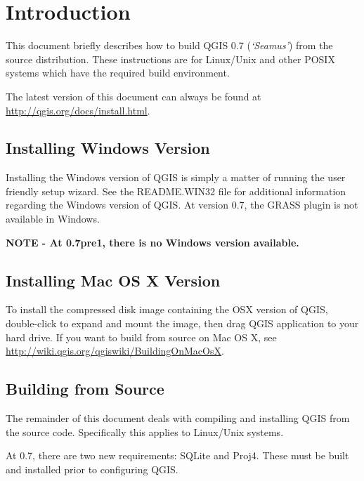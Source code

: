 
\section{Introduction}\label{label_introduction}
This document briefly describes how to build QGIS 0.7 (\textit{`Seamus'}) from the source distribution. These instructions are for Linux/Unix and other POSIX systems which have the required build environment.

The latest version of this document can always be found at \url{http://qgis.org/docs/install.html}.
\subsection{Installing Windows Version}
Installing the Windows version of QGIS is simply a matter of running the user friendly setup wizard. See the README.WIN32 file for additional information regarding the Windows version of QGIS. At version 0.7, the GRASS plugin is not available in Windows.

\textbf{NOTE - At 0.7pre1, there is no Windows version available.}

\subsection{Installing Mac OS X Version}
To install the compressed disk image containing the OSX version of QGIS,
double-click to expand and mount the image, then drag QGIS application to your
hard drive. If you want to build from source on Mac OS X, see \url{http://wiki.qgis.org/qgiswiki/BuildingOnMacOsX}.


\subsection{Building from Source}
The remainder of this document deals with compiling and installing QGIS from the
source code. Specifically this applies to Linux/Unix systems.

At 0.7, there are two new requirements: SQLite and Proj4. These must be built and installed prior to configuring QGIS.

